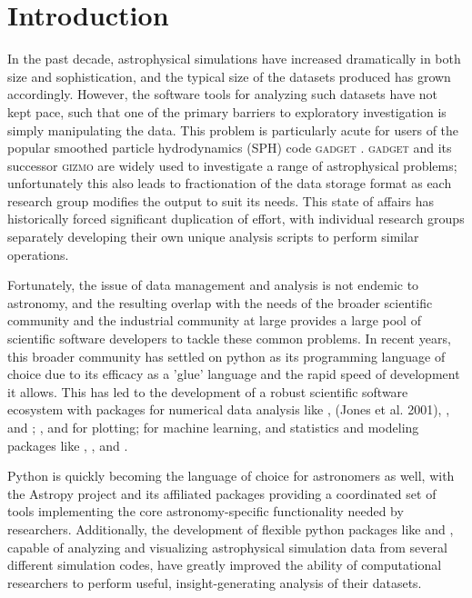 \section{Introduction}
\label{sec:intro}

In the past decade, astrophysical simulations have increased dramatically in both size and sophistication, and the typical size of the datasets produced has grown accordingly.  
However, the software tools for analyzing such datasets have not kept pace, such that one of the primary barriers to exploratory investigation is simply manipulating the data.  
This problem is particularly acute for users of the popular smoothed particle hydrodynamics (SPH) code \textsc{gadget} \citep{SpringelYoshidaWhite2001,Springel2005}.  
\textsc{gadget} and its successor \textsc{gizmo} \citep{Hopkins2015} are widely used to investigate a range of astrophysical problems; unfortunately this also leads to fractionation of the data storage format as each research group modifies the output to suit its needs.
This state of affairs has historically forced significant duplication of effort, with individual research groups separately developing their own unique analysis scripts to perform similar operations.

Fortunately, the issue of data management and analysis is not endemic to astronomy, and the resulting overlap with the needs of the broader scientific community and the industrial community at large provides a large pool of scientific software developers to tackle these common problems.
In recent years, this broader community has settled on python as its programming language of choice due to its efficacy as a 'glue' language and the rapid speed of development it allows.  
This has led to the development of a robust scientific software ecosystem with packages for numerical data analysis like  \citep{Oliphant2006,VanderWaltColbertVaroquaux2011},  (Jones et al. 2001),  \citep{McKinney2011}, and ;  \citep{Hunter2007}, and  for plotting;  for machine learning, and statistics and modeling packages like , , and  \citep{Foreman-Mackeyetal2013}.

Python is quickly becoming the language of choice for astronomers as well, with the Astropy project \citep{Robitailleetal2013} and its affiliated packages providing a coordinated set of tools implementing the core astronomy-specific functionality needed by researchers. 
Additionally, the development of flexible python packages like  \citep{Turketal2011} and  \citep{Pontzenetal2013}, capable of analyzing and visualizing astrophysical simulation data from several different simulation codes, have greatly improved the ability of computational researchers to perform useful, insight-generating analysis of their datasets.

